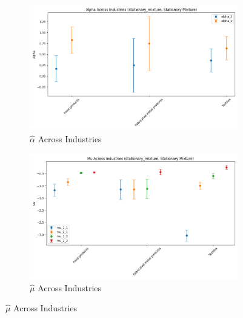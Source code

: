 \documentclass{article}
\begin{document}
\begin{figure}[ht!]
    \centering 
    \caption{I.I.D Mixture Model Across Industries}
    \begin{subfigure}[t]{0.32\textwidth}
        \centering
        \includegraphics[width=\textwidth]{figure/stationary_mixture_alpha_across_industries.png}
        \caption{$\hat\alpha$ Across Industries}
    \end{subfigure}
    \begin{subfigure}[t]{0.32\textwidth}
        \centering
        \includegraphics[width=\textwidth]{figure/stationary_mixture_mu_across_industries.png}
        \caption{$\hat\mu$ Across Industries}
    \end{subfigure}


\end{figure}
\end{document}

